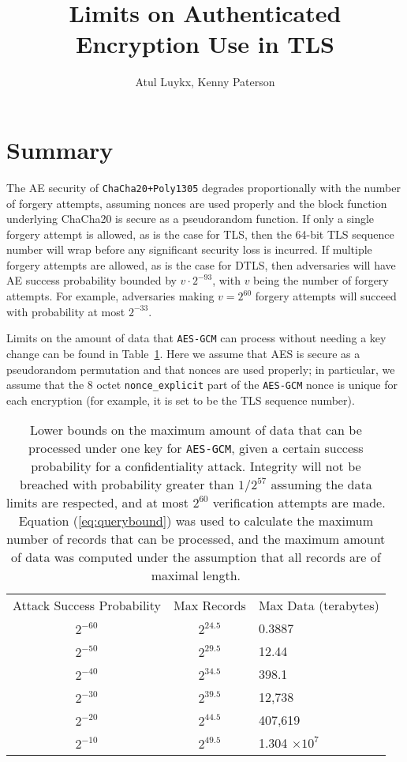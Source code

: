 \documentclass{article}
\title{Limits on Authenticated Encryption Use in TLS}
\author{Atul Luykx, Kenny Paterson}
\begin{document}
\maketitle



\section{Summary}
The AE security of \texttt{ChaCha20+Poly1305} degrades proportionally with the number of forgery attempts, assuming nonces are used properly and the block function underlying ChaCha20 is secure as a pseudorandom function. If only a single forgery attempt is allowed, as is the case for TLS, then the 64-bit TLS sequence number will wrap before any significant security loss is incurred. If multiple forgery attempts are allowed, as is the case for DTLS, then adversaries will have AE success probability bounded by $v\cdot 2^{-93}$, with $v$ being the number of forgery attempts. For example, adversaries making $v = 2^{60}$ forgery attempts will succeed with probability at most $2^{-33}$.


Limits on the amount of data that \texttt{AES-GCM} can process without needing a key change can be found in Table~\ref{table:gcm-bounds}. Here we  assume that AES is secure as a pseudorandom permutation and that nonces are used properly; in particular, we assume that the 8 octet \verb|nonce_explicit| part of the \texttt{AES-GCM} nonce is unique for each encryption (for example, it is set to be the TLS sequence number). 


\medskip
\begin{table}[H]
  \centering
  \caption{Lower bounds on the maximum amount of data that can be processed under one key for \texttt{AES-GCM}, given a certain success probability for a confidentiality attack. Integrity will not be breached with probability greater than $1/2^{57}$ assuming the data limits are respected, and at most $2^{60}$ verification attempts are made. Equation (\ref{eq:querybound}) was used to calculate the maximum number of records that can be processed, and the maximum amount of data was computed under the assumption that all records are of maximal length.}\label{table:gcm-bounds}
  \begin{tabular}{ccl}
    \toprule
    Attack Success Probability  & Max Records & Max Data (terabytes)\\
    \cmidrule{1-3}
    $2^{-60}$ & $2^{24.5}$ & 0.3887\\
    $2^{-50}$ & $2^{29.5}$ & 12.44 \\
    $2^{-40}$ & $2^{34.5}$ & 398.1\\
    $2^{-30}$ & $2^{39.5}$ & 12,738\\
    $2^{-20}$ & $2^{44.5}$ & 407,619\\
    $2^{-10}$ & $2^{49.5}$ & 1.304 $\times 10^7$\\
    \bottomrule
  \end{tabular}
\end{table}
\medskip
\end{document}
